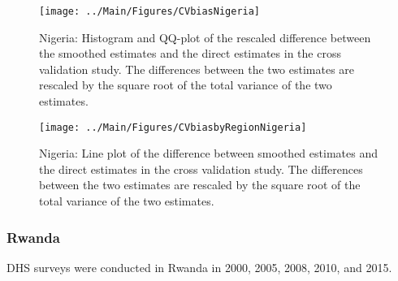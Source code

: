 \documentclass[12pt]{article}\usepackage[]{graphicx}\usepackage[]{color}
\newenvironment{knitrout}{}{} %
\begin{document}
\begin{knitrout}
\color{fgcolor}\begin{figure}[bht]

{\centering \texttt{[image: ../Main/Figures/CVbiasNigeria]} 

}

\caption[Nigeria]{Nigeria: Histogram and QQ-plot of the rescaled difference between the smoothed estimates and the direct estimates in the cross validation study. The differences between the two estimates are rescaled by the square root of the total variance of the two estimates.}\label{fig:unnamed-chunk-269}
\end{figure}


\end{knitrout}

\begin{knitrout}
\color{fgcolor}\begin{figure}[bht]

{\centering \texttt{[image: ../Main/Figures/CVbiasbyRegionNigeria]} 

}

\caption[Nigeria]{Nigeria: Line plot of the difference between smoothed estimates and the direct estimates in the cross validation study. The differences between the two estimates are rescaled by the square root of the total variance of the two estimates.}\label{fig:unnamed-chunk-270}
\end{figure}


\end{knitrout}


\clearpage
\subsubsection{Rwanda}





DHS surveys were conducted in Rwanda in 2000, 2005, 2008, 2010, and 2015.
\end{document}
